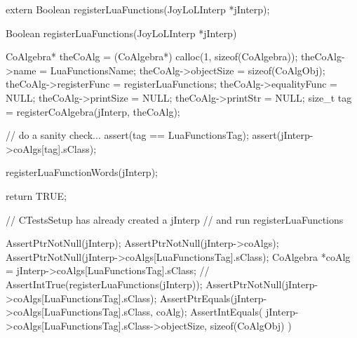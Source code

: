 \stoptyping

\startTestSuite[registerLuaFunctions]

\startCHeader
extern Boolean registerLuaFunctions(JoyLoLInterp *jInterp);
\stopCHeader
{}

\startCCode
Boolean registerLuaFunctions(JoyLoLInterp *jInterp) {
  CoAlgebra* theCoAlg    = (CoAlgebra*) calloc(1, sizeof(CoAlgebra));
  theCoAlg->name         = LuaFunctionsName;
  theCoAlg->objectSize   = sizeof(CoAlgObj);
  theCoAlg->registerFunc = registerLuaFunctions;
  theCoAlg->equalityFunc = NULL;
  theCoAlg->printSize    = NULL;
  theCoAlg->printStr     = NULL;
  size_t tag = registerCoAlgebra(jInterp, theCoAlg);

  // do a sanity check...
  assert(tag == LuaFunctionsTag);
  assert(jInterp->coAlgs[tag].sClass);
  
  registerLuaFunctionWords(jInterp);
  
  return TRUE;
}
\stopCCode


\startCTest
  // CTestsSetup has already created a jInterp
  // and run registerLuaFunctions
  
  AssertPtrNotNull(jInterp);
  AssertPtrNotNull(jInterp->coAlgs);
  AssertPtrNotNull(jInterp->coAlgs[LuaFunctionsTag].sClass);
  CoAlgebra *coAlg = jInterp->coAlgs[LuaFunctionsTag].sClass;
//  AssertIntTrue(registerLuaFunctions(jInterp));
  AssertPtrNotNull(jInterp->coAlgs[LuaFunctionsTag].sClass);
  AssertPtrEquals(jInterp->coAlgs[LuaFunctionsTag].sClass, coAlg);
  AssertIntEquals(
    jInterp->coAlgs[LuaFunctionsTag].sClass->objectSize,
    sizeof(CoAlgObj)
  )
\stopCTest
\stopTestCase
\stopTestSuite
